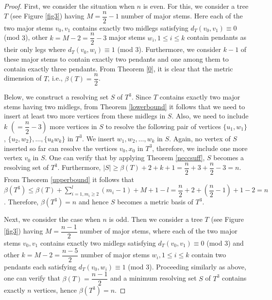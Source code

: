 \documentclass{article}
\theoremstyle{definition}
\numberwithin{equation}{section}
\begin{document}
\begin{proof}
First, we consider the situation when $n$ is even. For this, we consider a tree $T$ (see Figure \ref{fig3}) having $M=\dfrac{n}{2}-1$ number of major stems. Here each of the two major stems $v_{0},v_{1}$ contains exactly two midlegs satisfying $d_{T}(v_{0},v_{1})\equiv 0$ (mod $3$), other $k=M-2=\dfrac{n}{2}-3$ major stems $w_{i}, 1\leq i\leq k$ contain pendants as their only legs where $d_{T}(v_{0},w_{i})\equiv 1$ (mod $3$). Furthermore, we consider $k-1$ of these major stems to contain exactly two pendants and one among them to contain exactly three pendants. From Theorem \ref{0}, it is clear that the metric dimension of $T$, i.e., $\beta{(T)}=\dfrac{n}{2}$. 

\vspace{0.4em}
Below, we construct a resolving set $S$ of $T^{3}$. Since $T$ contains exactly two major stems having two midlegs, from Theorem \ref{lowerbound} it follows that we need to insert at least two more vertices from these midlegs in $S$. Also, we need to include $k$ $(=\dfrac{n}{2}-3)$ more vertices in $S$ to resolve the following pair of vertices $\{u_{1},w_{1}\}$, $\{u_{2}, w_{2}\},\hdots,\{u_{k}w_{k}\}$ in $T^{3}$. We insert $w_{1},w_{2},\hdots, w_{k}$ in $S$. Again, no vertex of $S$ inserted so far can resolve the vertices $v_{0},x_{0}$ in $T^{3}$, therefore, we include one more vertex $v_{0}$ in $S$. One can verify that by applying Theorem \ref{neccsuff}, $S$ becomes a resolving set of $T^{3}$. Furthermore, $|S|\geq \beta{(T)}+2+k+1=\dfrac{n}{2}+3+\dfrac{n}{2}-3=n$.
From Theorem \ref{upperbound} it follows that $\beta{(T^{3})}\leq \beta{(T)}+\sum\limits_{i=1,m_{i}\geq 2}^{l} (m_{i}-1)+M+1-l=\dfrac{n}{2}+2+ (\dfrac{n}{2}-1)+1-2=n$. Therefore, $\beta{(T^{3})}=n$ and hence $S$ becomes a metric basis of $T^{3}$.

\vspace{0.4em}
\noindent Next, we consider the case when $n$ is odd. Then we consider a tree $T$ (see Figure \ref{fig3}) having $M=\dfrac{n-1}{2}$ number of major stems, where each of the two major stems $v_{0},v_{1}$ contains exactly two midlegs satisfying $d_{T}(v_{0},v_{1})\equiv 0$ (mod $3$) and other $k=M-2=\dfrac{n-5}{2}$ number of major stems $w_{i}, 1\leq i\leq k$ contain two pendants each satisfying $d_{T}(v_{0},w_{i})\equiv 1$ (mod $3$). Proceeding similarly as above, one can verify that $\beta{(T)}=\dfrac{n-1}{2}$ and a minimum resolving set $S$ of $T^{3}$ contains exactly $n$ vertices, hence $\beta{(T^{3})}=n$.
\end{proof}
\end{document}
